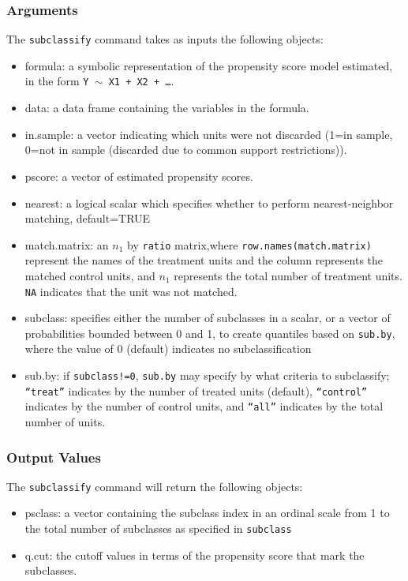 \documentclass[oneside,letterpaper,titlepage]{article}
\begin{document}
\begin{appendix}
\subsubsection{Arguments}
The \texttt{subclassify} command takes as inputs the following
objects:
\begin{itemize}
\item{formula}: a symbolic representation of the propensity score
  model estimated, in the form {\tt Y $\sim$ X1 + X2 + \dots}.
\item{data}: a data frame containing the variables in the formula.
\item{in.sample}: a vector indicating which units were not discarded
  (1=in sample, 0=not in sample (discarded due to common support
  restrictions)).
\item{pscore}: a vector of estimated propensity scores.  
\item{nearest}: a logical scalar which specifies whether
  to perform nearest-neighbor matching, default=TRUE 
\item{match.matrix}: an $n_1$ by \texttt{ratio} matrix,where
  \texttt{row.names(match.matrix)} represent the names of the
  treatment units and the column represents the matched control units,
  and $n_1$ represents the total number of treatment units.
  \texttt{NA} indicates that the unit was not matched.
\item{subclass}: specifies either the number of subclasses in a
  scalar, or a vector of probabilities bounded between 0 and 1, to
  create quantiles based on \texttt{sub.by}, where the value of 0
  (default) indicates no subclassification
\item{sub.by}: if \texttt{subclass!=0}, \texttt{sub.by} may specify by
  what criteria to subclassify; {\tt ``treat''} indicates by the
  number of treated units (default), {\tt ``control''} indicates by
  the number of control units, and {\tt ``all''} indicates by the
  total number of units.
\end{itemize}

\subsubsection{Output Values}
The \texttt{subclassify} command will return the following objects: 
\begin{itemize}
\item{psclass}: a vector containing the subclass index in an ordinal scale
  from 1 to the total number of subclasses as specified in
  \texttt{subclass} 
\item{q.cut}: the cutoff values in terms of the propensity score that
  mark the subclasses.
\end{itemize}


\end{appendix}
\end{document}
